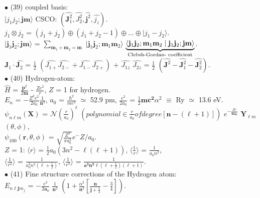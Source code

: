 \documentclass[10pt,fancy]{elegantbook}
\begin{document}
{$\bullet$ (39) coupled basis:  \\
$\mid {j_1} {j_2 ;} \mathbf{jm} \rangle$ CSCO: $(\hat{\mathbf J^2_1}, \hat{J^2_2}, \hat{\mathbf j^2}, \hat{j_z})$.  \\  
$j_1 \otimes j_2$ = $(j_1 + j_2) \oplus  (j_1 + j_2 - 1)\oplus...\oplus \mid j_1 - j_2 \rangle$.  \\  
$\mid  \mathbf j_1 \mathbf j_2; \mathbf{jm} \rangle$ = $ \sum_{\mathbf m_1 + \mathbf m_2 = \mathbf m}$ $ \mid {\mathbf j_1}{\mathbf j_2}; {\mathbf m_1}{\mathbf m_2} \rangle$ $\underbrace{\langle{\mathbf j_1 \mathbf j_2}; {\mathbf m_1 \mathbf m_2} \mid {\mathbf j_1 \mathbf j_2}; \mathbf{jm} \rangle}_{\text{Clebsh-Gordan- coefficient\index{Clebsch-Gordan-coefficient}}}$. \\  
$\hat{\mathbf J_1} \cdot \hat{\mathbf J_2}$ = $\frac{1}{2}$ $( \hat{\mathit J_{1 +}} \hat{\mathit J_{2 -}} + \hat{\mathit J_{1 -}} \hat{\mathit J_{2 +}})$ + $ \hat{\mathit J_{1z}}$ $\hat{\mathit J_{2z}}$ = $ \frac{1}{2}$ $(\hat{\mathbf J^2} - \hat{\mathbf J^2_1} - \hat{\mathbf J^2_2})$. \\

$\bullet$ (40) Hydrogen-atom:  \\ 
$\hat{H}$ = $ \frac{\hat{\mathbf p^2}} {2 {\mathbf m}}$ - $ \frac{\mathit Z e^2}{r}$, $ \mathit Z$ = 1 for hydrogen. \\ 
$ \mathit E_n$ = $ - \frac{\mathit {Z^2 e^2}}{2a_0} \frac{1}{\mathbf n^2}$, $a_0$ = $ \frac{\hbar^2}{me^2}$ $ \simeq$ 52.9 pm, $ \frac{e^2}{2a_0}$ = $ \frac{1}{2} \mathbf {mc^2} \alpha^2$ $ \equiv$ Ry $ \simeq$ 13.6 eV. \\ 
$ \psi_{n \ell m} (\mathbf X)$ = $ \mathcal N ( \frac{r}{a_0})^\ell$ $ ( polynomial \in {\frac{r}{a_0}} of degree [{\mathbf {n} - (\ell + 1)}])$ $ e^{- \frac{\mathit Zr} {\mathbf {n a_0}}}$ $\mathbf Y_{\ell m}$ $(\theta, \phi)$, \\ 
$\psi_{100} ( \mathbf r, \theta, \phi)$ = $ {\sqrt{\frac{\mathit Z^3}{\pi a^3_0}} e^-{\mathit Z/a_0}}$. \\ 
$\mathit Z$ = 1: $ \langle r \rangle$ = $ \frac{1}{2} a_0(3n^2 - \ell(\ell + 1))$, $ \langle \frac{1}{r} \rangle$ = $ \frac{1}{a_0n^2}$,  \\  
$\langle \frac{1}{r^2} \rangle$ = $ \frac{1}{a^2_0 n^3 (\ell + \frac{1}{2})}$, $ \langle \frac{1}{r^3} \rangle$ = $ \frac{1}{\mathbf {a^3 n^3} \ell (\ell + \frac{1}{2}) (\ell + 1)}$.  \\

$\bullet$ (41) Fine structure corrections of the Hydrogen atom:  \\
$\mathit E_{n \ell {\mathbf j m_j}}$ = $ - \frac{e^2}{2 \mathbf a_0}$ $ \frac{1}{\mathbf n^2}$ $ (1 + \frac{\alpha^2}{\mathbf n^2} [\frac{\mathbf n}{\mathbf j + \frac{1}{2}} - \frac{3}{4}])$.  \\

}
\end{document}
